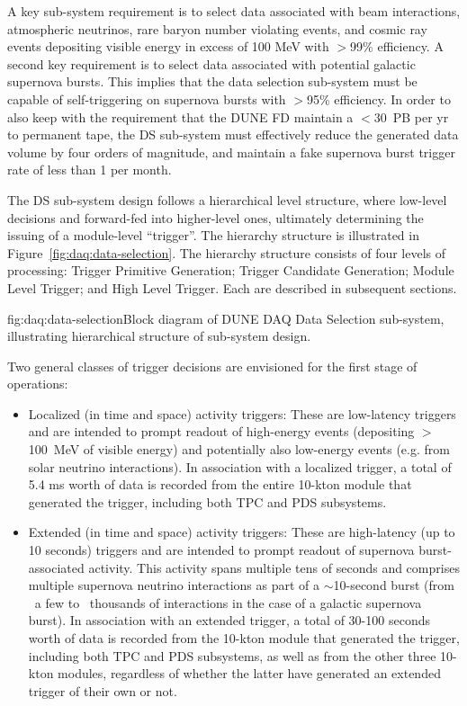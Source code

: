 A key sub-system requirement is to select data associated with beam
interactions, atmospheric neutrinos, rare baryon number violating events,
and cosmic ray events depositing visible energy in excess of 100 MeV
with $\gt$99\% efficiency. A second key requirement is to select data
associated with potential galactic supernova bursts. This implies that
the data selection sub-system must be capable of self-triggering on
supernova bursts with $\gt$95\% efficiency. In order to also keep with the
requirement that the DUNE FD maintain a $\lt$30~PB per yr to permanent
tape, the DS sub-system must effectively reduce the generated data
volume by four orders of magnitude, and maintain a fake supernova
burst trigger rate of less than 1 per month.

The DS sub-system design follows a hierarchical level structure, where low-level
decisions and forward-fed into higher-level ones, ultimately
determining the issuing of a  module-level ``trigger''. The hierarchy
structure is illustrated in Figure~\ref{fig:daq:data-selection}. The hierarchy structure
consists of four levels of processing: Trigger Primitive Generation;
Trigger Candidate Generation; Module Level Trigger; and High Level
Trigger. Each are described in subsequent sections.

\begin{dunefigure}{fig:daq:data-selection}{Block diagram of DUNE DAQ
    Data Selection sub-system, illustrating hierarchical structure of
    sub-system design.}
\end{dunefigure}

Two general classes of trigger decisions are envisioned for the first
stage of operations:
\begin{itemize}
 \item Localized (in time and space) activity triggers: These are
   low-latency triggers and are intended to prompt readout of
   high-energy events (depositing $\gt$100~MeV of visible energy) 
   and potentially also low-energy events
   (e.g. from solar neutrino interactions). In association with a
   localized trigger, a total of 5.4 ms worth of data is recorded from
   the entire 10-kton module that generated the trigger, including
   both TPC and PDS subsystems.   
\item Extended (in time and space) activity triggers: These are
  high-latency (up to 10 seconds) triggers and are intended to prompt readout of
  supernova burst-associated activity. This activity spans multiple
  tens of seconds and comprises multiple supernova neutrino
  interactions as part of a $\sim$10-second burst (from ~a few to
  ~thousands of interactions in the case of a galactic supernova
  burst). In association with an extended trigger, a total of 30-100
  seconds worth of data is recorded from the 10-kton module that
  generated the trigger, including both TPC and PDS subsystems, as
  well as from the other three 10-kton modules, regardless of whether
  the latter have generated an extended trigger of their own or not.  
\end{itemize}

